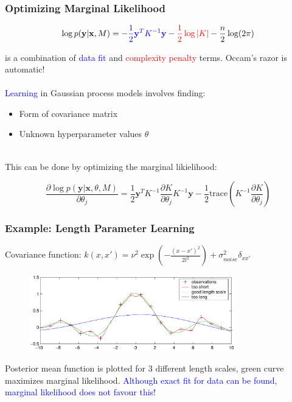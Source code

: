 \documentclass[10pt]{beamer}
\newcommand{\bx}{\mathbf{x}}
\newcommand{\by}{\mathbf{y}}
\begin{document}
  \begin{frame}[noframenumbering]
    \frametitle{Optimizing Marginal Likelihood}
    \begin{equation*}
      \log p(\by|\bx,M) = - \textcolor{blue}{\frac{1}{2} \by^T K^{-1} \by} - \textcolor{red}{\frac{1}{2} \log|K|} - \frac{n}{2} \log (2\pi)
    \end{equation*}

    is a combination of \textcolor{blue}{data fit} and \textcolor{red}{complexity penalty} terms. Occam's razor is automatic!\\~\\

    \textcolor{blue}{Learning} in Gaussian process models involves finding:
      \begin{itemize}
        \item Form of covariance matrix
        \item Unknown hyperparameter values $\theta$
      \end{itemize}

    ~\\ This can be done by optimizing the marginal likielihood:

    \begin{equation*}
      \frac{\partial \log p(\by|\bx,\theta,M)}{\partial \theta_j} = \frac{1}{2} \by^T K^{-1} \frac{\partial K}{\partial \theta_j} K^{-1} \by - \frac{1}{2} \text{trace} \left( K^{-1} \frac{\partial K}{\partial \theta_j} \right)
    \end{equation*}
  \end{frame}

  \begin{frame}[noframenumbering]
    \frametitle{Example: Length Parameter Learning}

    Covariance function: $k(x,x') = \nu^2 \exp \left( - \frac{(x - x')^2}{2l^2} \right) + \sigma_{noise}^2 \delta_{xx'}$

    \begin{figure}
      \centering
      \includegraphics[width=0.8\textwidth]{gpLearning.png}
    \end{figure}

    Posterior mean function is plotted for 3 different length scales, green curve maximizes marginal likelihood. \textcolor{blue}{Although exact fit for data can be found, marginal likelihood does not favour this!}
  \end{frame}
\end{document}
